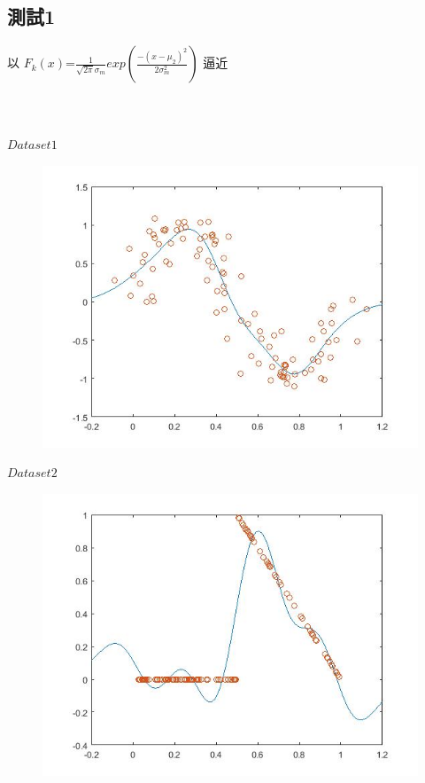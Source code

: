 \documentclass[a4paper,margin=1in]{article}
\begin{document}
\subsection{測試1}
以 $F_{k}(x)$=$\frac{1}{{\sqrt{2\pi}\sigma_m}}exp( \frac{-(x-\mu_{2})^2}{2\sigma_{m}^2} )$ 逼近\\ \\ \\ \\
$Dataset1$
\begin{figure}[!htbp]
	\centering
	\includegraphics[width=\linewidth]{Figure11.jpg}
\end{figure}
\newpage
$Dataset2$
\begin{figure}[!htbp]
	\centering
	\includegraphics[width=\linewidth]{Figure12.jpg}
\end{figure}
\end{document}
